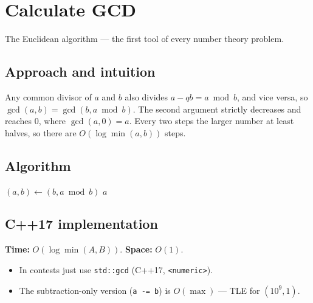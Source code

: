 \section{Calculate GCD}
\label{sec:n-gcd}


\begin{patternbox}
The Euclidean algorithm --- the first tool of every number theory problem.
\end{patternbox}

\subsection*{Approach and intuition}

Any common divisor of $a$ and $b$ also divides $a-qb=a\bmod b$, and vice
versa, so $\gcd(a,b)=\gcd(b,a\bmod b)$. The second argument strictly
decreases and reaches $0$, where $\gcd(a,0)=a$. Every two steps the larger
number at least halves, so there are $O(\log\min(a,b))$ steps.

\subsection*{Algorithm}
\begin{algorithmic}[1]
 \State $(a,b)\gets(b,a\bmod b)$ \EndWhile
\State \Return $a$
\end{algorithmic}


\subsection*{C++17 implementation}

\begin{complexitybox}
\textbf{Time:} $O(\log\min(A,B))$. \textbf{Space:} $O(1)$.
\end{complexitybox}

\begin{pitfallbox}
\begin{itemize}
  \item In contests just use \texttt{std::gcd} (C++17, \texttt{<numeric>}).
  \item The subtraction-only version (\texttt{a -= b}) is $O(\max)$ ---
        TLE for $(10^9,1)$.
\end{itemize}
\end{pitfallbox}
